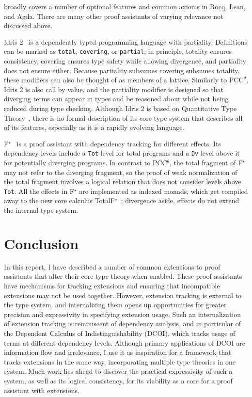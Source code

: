 \documentclass{article}
\newcommand{\code}[1]{\texttt{#1}}
\begin{document}
 broadly covers a number of optional features
and common axioms in Rocq, Lean, and Agda.
There are many other proof assistants of varying relevance not discussed above.

Idris 2~\citep{idris2} is a dependently typed programming language with partiality.
Definitions can be marked as \code{total}, \code{covering}, or \code{partial};
in principle, totality ensures consistency,
covering ensures type safety while allowing divergence,
and partiality does not ensure either.
Because partiality subsumes covering subsumes totality,
these modifiers can also be thought of as members of a lattice.
Similarly to PCC$^\theta$, Idris 2 is also call by value,
and the partiality modifier is designed so that
diverging terms can appear in types and be reasoned about
while not being reduced during type checking.
Although Idris 2 is based on Quantitative Type Theory~\citep{qtt},
there is no formal description of its core type system that describes all of its features,
especially as it is a rapidly evolving language.

F$^\star$~\citep{fstar} is a proof assistant with dependency tracking for different effects.
Its dependency levels include a \code{Tot} level for total programs
and a \code{Dv} level above it for potentially diverging programs.
In contrast to PCC$^\theta$,
the total fragment of F$^\star$ may not refer to the diverging fragment,
so the proof of weak normalization of the total fragment
involves a logical relation that does not consider levels above \code{Tot}.
All the effects in F$^\star$ are implemented as indexed monads,
which get compiled away to the new core calculus TotalF$^\star$~\citep{total-fstar};
divergence aside, effects do not extend the internal type system.

\section{Conclusion}

In this report, I have described a number of common extensions
to proof assistants that alter their core type theory when enabled.
These proof assistants have mechanisms for tracking extensions
and ensuring that incompatible extensions may not be used together.
However, extension tracking is external to the type system,
and internalizing them opens up opportunities
for greater precision and expressivity in specifying extension usage.
Such an internalization of extension tracking is reminiscent of dependency analysis,
and in particular of the Dependent Calculus of Indistinguishability (DCOI),
which tracks usage of terms at different dependency levels.
Although primary applications of DCOI are information flow and irrelevance,
I use it as inspiration for a framework that tracks extensions in the same way,
incorporating multiple type theories in one system.
Much work lies ahead to discover the practical expressivity of such a system,
as well as its logical consistency,
for its viability as a core for a proof assistant with extensions.

\clearpage
\noindent

\end{document}
